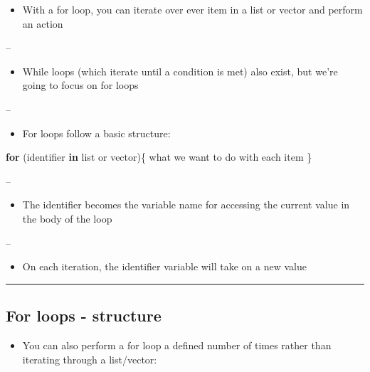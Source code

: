 \documentclass[]{article}
\newenvironment{Shaded}{\begin{snugshade}}{\end{snugshade}}
\newcommand{\ControlFlowTok}[1]{\textcolor[rgb]{0.13,0.29,0.53}{\textbf{#1}}}
\newcommand{\NormalTok}[1]{#1}
\providecommand{\tightlist}{%
  \setlength{\itemsep}{0pt}\setlength{\parskip}{0pt}}
\begin{document}
\begin{itemize}
\tightlist
\item
  With a for loop, you can iterate over ever item in a list or vector
  and perform an action
\end{itemize}

--

\begin{itemize}
\tightlist
\item
  While loops (which iterate until a condition is met) also exist, but
  we're going to focus on for loops
\end{itemize}

--

\begin{itemize}
\tightlist
\item
  For loops follow a basic structure:
\end{itemize}

\begin{Shaded}
\begin{Highlighting}[]
\ControlFlowTok{for}\NormalTok{ (identifier }\ControlFlowTok{in}\NormalTok{ list or vector)\{}
\NormalTok{  what we want to do with each item}
\NormalTok{\}}
\end{Highlighting}
\end{Shaded}

--

\begin{itemize}
\tightlist
\item
  The identifier becomes the variable name for accessing the current
  value in the body of the loop
\end{itemize}

--

\begin{itemize}
\tightlist
\item
  On each iteration, the identifier variable will take on a new value
\end{itemize}

\begin{center}\rule{0.5\linewidth}{\linethickness}\end{center}

\hypertarget{for-loops---structure}{%
\subsection{For loops - structure}\label{for-loops---structure}}

\begin{itemize}
\tightlist
\item
  You can also perform a for loop a defined number of times rather than
  iterating through a list/vector:
\end{itemize}
\end{document}
